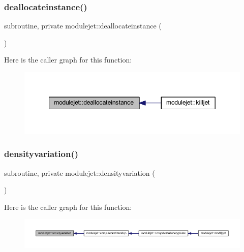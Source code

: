 \subsubsection{\texorpdfstring{deallocateinstance()}{deallocateinstance()}}
{\footnotesize\ttfamily subroutine, private modulejet\+::deallocateinstance (\begin{DoxyParamCaption}{ }\end{DoxyParamCaption})\hspace{0.3cm}{\ttfamily [private]}}

Here is the caller graph for this function\+:\nopagebreak
\begin{figure}[H]
\begin{center}
\leavevmode
\includegraphics[width=349pt]{namespacemodulejet_aed198ff7ee371124ec0afa1cd4cfe116_icgraph}
\end{center}
\end{figure}
\mbox{\label{namespacemodulejet_a05449786a790959e45db1fc1bd9f93f6}} 
\subsubsection{\texorpdfstring{densityvariation()}{densityvariation()}}
{\footnotesize\ttfamily subroutine, private modulejet\+::densityvariation (\begin{DoxyParamCaption}{ }\end{DoxyParamCaption})\hspace{0.3cm}{\ttfamily [private]}}

Here is the caller graph for this function\+:\nopagebreak
\begin{figure}[H]
\begin{center}
\leavevmode
\includegraphics[width=350pt]{namespacemodulejet_a05449786a790959e45db1fc1bd9f93f6_icgraph}
\end{center}
\end{figure}
\mbox{\label{namespacemodulejet_a54205285b4f5a4d3d7204aa240f92d64}} 
